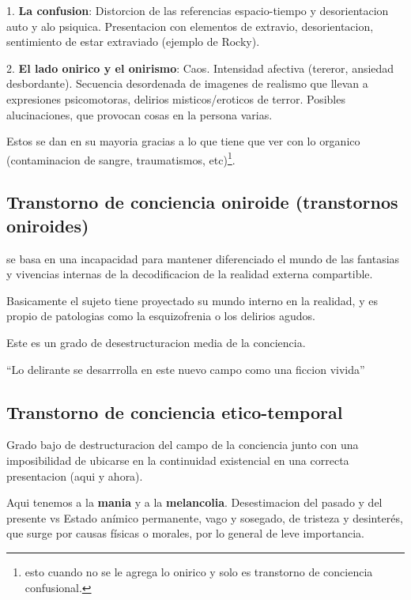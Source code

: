 \documentclass[12pt,a4paper]{article}
\begin{document}
1. \textbf{La confusion}: Distorcion de las referencias espacio-tiempo y desorientacion auto y alo psiquica. Presentacion con elementos de extravio, desorientacion, sentimiento de estar extraviado (ejemplo de Rocky).

2. \textbf{El lado onirico y el onirismo}: Caos. Intensidad afectiva (tereror, ansiedad desbordante). Secuencia desordenada de imagenes de realismo que llevan a expresiones psicomotoras, delirios misticos/eroticos de terror. Posibles alucinaciones, que provocan cosas en la persona varias.

Estos se dan en su mayoria gracias a lo que tiene que ver con lo organico (contaminacion de sangre, traumatismos, etc)\footnote{esto cuando no se le agrega lo onirico y solo es transtorno de conciencia confusional.}.

\subsection{Transtorno de conciencia oniroide (transtornos oniroides)}%
\label{sub:transtorno_de_conciencia_oniroide_transtornos_oniroides_}

se basa en una incapacidad para mantener diferenciado el mundo de las fantasias y vivencias internas de la decodificacion de la realidad externa compartible.

Basicamente el sujeto tiene proyectado su mundo interno en la realidad, y es propio de patologias como la esquizofrenia o los delirios agudos. 

Este es un grado de desestructuracion media de la conciencia.

\enquote{Lo delirante se desarrrolla en este nuevo campo como una ficcion vivida} 

\subsection{Transtorno de conciencia etico-temporal}%
\label{sub:transtorno_de_conciencia_etico_temporal}

Grado bajo de destructuracion del campo de la conciencia junto con una imposibilidad de ubicarse en la continuidad existencial en una correcta presentacion (aqui y ahora). 

Aqui tenemos a la \textbf{mania} y a la \textbf{melancolia}. Desestimacion del pasado y del presente vs Estado anímico permanente, vago y sosegado, de tristeza y desinterés, que surge por causas físicas o morales, por lo general de leve importancia.
\end{document}
